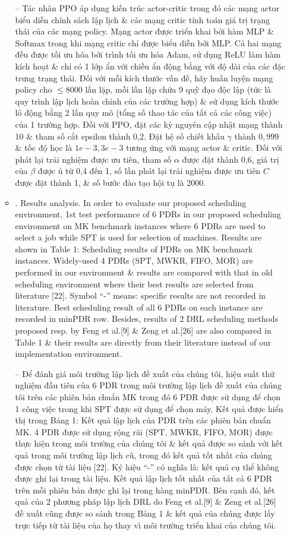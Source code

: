 \documentclass{article}
\begin{document}
\begin{itemize}
\begin{itemize}
        -- Tác nhân PPO áp dụng kiến trúc actor-critic trong đó các mạng actor biểu diễn chính sách lập lịch \& các mạng critic tính toán giá trị trạng thái của các mạng policy. Mạng actor được triển khai bởi hàm MLP \& Softmax trong khi mạng critic chỉ được biểu diễn bởi MLP. Cả hai mạng đều được tối ưu hóa bởi trình tối ưu hóa Adam, sử dụng ReLU làm hàm kích hoạt \& chỉ có 1 lớp ẩn với chiều ẩn động bằng với độ dài của các đặc trưng trạng thái. Đối với mỗi kích thước vấn đề, hãy huấn luyện mạng policy cho $\le8000$ lần lặp, mỗi lần lặp chứa 9 quỹ đạo độc lập (tức là quy trình lập lịch hoàn chỉnh của các trường hợp) \& sử dụng kích thước lô động bằng 2 lần quy mô (tổng số thao tác của tất cả các công việc) của 1 trường hợp. Đối với PPO, đặt các kỷ nguyên cập nhật mạng thành 10 \& tham số cắt epsilon thành 0,2. Đặt hệ số chiết khấu $\gamma$ thành $0,999$ \& tốc độ học là $1e-3,3e-3$ tương ứng với mạng actor \& critic. Đối với phát lại trải nghiệm được ưu tiên, tham số $\alpha$ được đặt thành 0,6, giá trị của $\beta$ được ủ từ 0,4 đến 1, số lần phát lại trải nghiệm được ưu tiên $C$ được đặt thành 1, \& số bước đào tạo hội tụ là 2000.
        \item {. Results analysis.} In order to evaluate our proposed scheduling environment, 1st test performance of 6 PDRs in our proposed scheduling environment on MK benchmark instances where 6 PDRs are used to select a job while SPT is used for selection of machines. Results are shown in {\sf Table 1: Scheduling results of PDRs on MK benchmark instances}. Widely-used 4 PDRs (SPT, MWKR, FIFO, MOR) are performed in our environment \& results are compared with that in old scheduling environment where their best results are selected from literature [22]. Symbol ``-'' means: specific results are not recorded in literature. Best scheduling result of all 6 PDRs on each instance are recorded in minPDR row. Besides, results of 2 DRL scheduling methods proposed resp. by Feng et al.[9] \& Zeng et al.[26] are also compared in Table 1 \& their results are directly from their literature instead of our implementation environment.

        -- Để đánh giá môi trường lập lịch đề xuất của chúng tôi, hiệu suất thử nghiệm đầu tiên của 6 PDR trong môi trường lập lịch đề xuất của chúng tôi trên các phiên bản chuẩn MK trong đó 6 PDR được sử dụng để chọn 1 công việc trong khi SPT được sử dụng để chọn máy. Kết quả được hiển thị trong {\sf Bảng 1: Kết quả lập lịch của PDR trên các phiên bản chuẩn MK}. 4 PDR được sử dụng rộng rãi (SPT, MWKR, FIFO, MOR) được thực hiện trong môi trường của chúng tôi \& kết quả được so sánh với kết quả trong môi trường lập lịch cũ, trong đó kết quả tốt nhất của chúng được chọn từ tài liệu [22]. Ký hiệu ``-'' có nghĩa là: kết quả cụ thể không được ghi lại trong tài liệu. Kết quả lập lịch tốt nhất của tất cả 6 PDR trên mỗi phiên bản được ghi lại trong hàng minPDR. Bên cạnh đó, kết quả của 2 phương pháp lập lịch DRL do Feng et al.[9] \& Zeng et al.[26] đề xuất cũng được so sánh trong Bảng 1 \& kết quả của chúng được lấy trực tiếp từ tài liệu của họ thay vì môi trường triển khai của chúng tôi.


\end{itemize}
\end{itemize}
\end{document}
